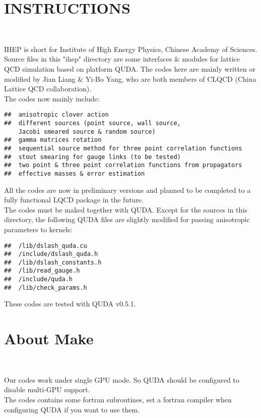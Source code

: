 \documentclass[12pt,fleqn]{article}
\begin{document}
\section{INSTRUCTIONS}
~

IHEP is short for Institute of High Energy Physics, Chinese Academy of Sciences.\\

Source files in this "ihep" directory are some interfaces $\&$ modules for
lattice QCD simulation based on platform QUDA. The codes here are mainly written
or modified by Jian Liang $\&$ Yi-Bo Yang, who are both members of CLQCD (China
Lattice QCD collaboration).\\

  The codes now mainly include:
  \begin{verbatim}
##  anisotropic clover action
##  different sources (point source, wall source,
    Jacobi smeared source & random source)
##  gamma matrices rotation
##  sequential source method for three point correlation functions
##  stout smearing for gauge links (to be tested)
##  two point & three point correlation functions from propagators
##  effective masses & error estimation
  \end{verbatim}

All the codes are now in preliminary versions and planned to be completed to a fully
functional LQCD package in the future.\\

The codes must be maked together with QUDA. Except for the sources in
this directory, the following QUDA files are slightly modified for passing anisotropic
parameters to kernels:
\begin{verbatim}
##  /lib/dslash_quda.cu
##  /include/dslash_quda.h
##  /lib/dslash_constants.h
##  /lib/read_gauge.h
##  /include/quda.h
##  /lib/check_params.h
\end{verbatim}

These codes are tested with QUDA v0.5.1.

\section{About Make}
~

Our codes work under single GPU mode. So QUDA should be configured to disable
multi-GPU support.\\

The codes contains some fortran subroutines, set a fortran compiler when
configuring QUDA if you want to use them.\\
\end{document}
